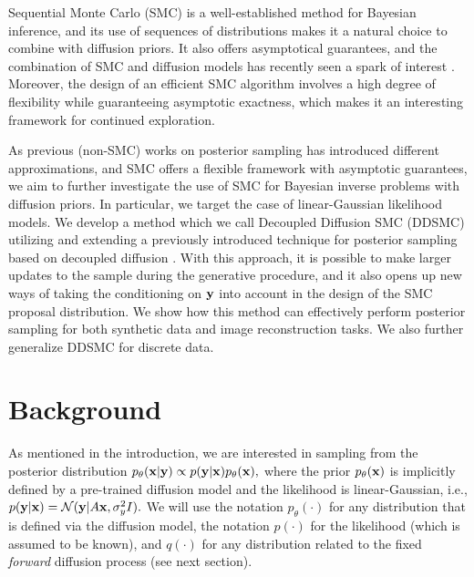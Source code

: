 \documentclass{proc}
\begin{document}
Sequential Monte Carlo (SMC) 
is a well-established method for Bayesian inference,
and its use of sequences of distributions makes it a natural choice to combine with diffusion priors. It also offers asymptotical guarantees, and the combination of SMC and diffusion models has recently seen a spark of interest \cite{trippe_diffusion_2023,dou_diffusion_2023-1,wu_practical_2023, cardoso_monte_2023-2}. Moreover, the design of an efficient SMC algorithm involves a high degree of flexibility while guaranteeing asymptotic exactness, which makes it an interesting framework for continued exploration. 

As previous (non-SMC) works on posterior sampling has introduced different approximations, and SMC offers a flexible framework with asymptotic guarantees, we aim to further investigate the use of SMC for Bayesian inverse problems with diffusion priors. In particular, we target the case of linear-Gaussian likelihood models. We develop a method which we call Decoupled Diffusion SMC (DDSMC) utilizing and extending a previously introduced technique for posterior sampling based on decoupled diffusion \citep{zhang_improving_2024}. With this approach, it is possible to make larger updates to the sample during the generative procedure, and it also opens up new ways of taking the conditioning on $\mathbf{y}$ into account in the design of the SMC proposal distribution. We show how this method can effectively perform posterior sampling for both synthetic data and image reconstruction tasks. We also further generalize DDSMC for discrete data.

\section{Background}
As mentioned in the introduction, we are interested in sampling from the posterior distribution
\(
    p_\theta(\mathbf{x}|\mathbf{y}) \propto p(\mathbf{y}|\mathbf{x})p_\theta(\mathbf{x}),
\)
where the prior $p_\theta(\mathbf{x})$ is implicitly defined by a pre-trained diffusion model and the likelihood is linear-Gaussian, i.e., 
\(
    p(\mathbf{y}|\mathbf{x}) = \mathcal{N}(\mathbf{y}|A\mathbf{x}, \sigma_y^2I).
\)
We will use the notation $p_\theta(\cdot)$ for any distribution that is defined via the diffusion model, the notation $p(\cdot)$ for the likelihood (which is assumed to be known), and $q(\cdot)$ for any distribution related to the fixed \emph{forward} diffusion process (see next section).
\end{document}
